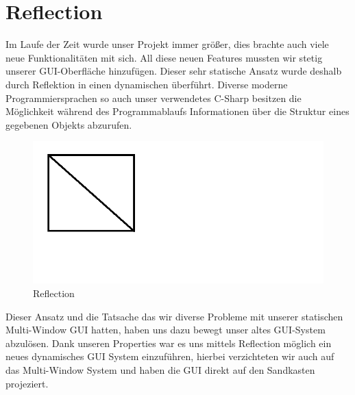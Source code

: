 \section{Reflection}
Im Laufe der Zeit wurde unser Projekt immer größer, dies brachte auch viele neue Funktionalitäten mit sich.
All diese neuen Features mussten wir stetig unserer GUI-Oberfläche hinzufügen. Dieser sehr statische Ansatz wurde deshalb durch Reflektion in einen dynamischen überführt.
Diverse moderne Programmiersprachen so auch unser verwendetes C-Sharp besitzen die Möglichkeit während des Programmablaufs Informationen über die Struktur eines gegebenen Objekts abzurufen.

\begin{figure}[h!]
	\vspace*{30px}
	\includegraphics[width=\columnwidth]{graphics/reflection.png}	
	\caption{Reflection}
	\label{fig:Reflection}
\end{figure}

Dieser Ansatz und die Tatsache das wir diverse Probleme mit unserer statischen Multi-Window GUI hatten, haben uns dazu bewegt unser altes GUI-System abzulösen.
Dank unseren Properties war es uns mittels Reflection möglich ein neues dynamisches GUI System einzuführen, hierbei verzichteten wir auch auf das Multi-Window System und haben die GUI direkt auf den Sandkasten projeziert.


\clearpage
